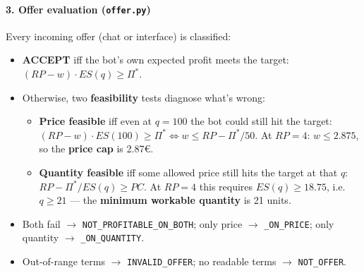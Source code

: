 \paragraph*{3. Offer evaluation (\texttt{offer.py})}
Every incoming offer (chat or interface) is classified:
\begin{itemize}
    \item \textbf{ACCEPT} iff the bot's own expected profit meets the
    target: $(RP - w)\cdot ES(q) \ge \Pi^*$.
    \item Otherwise, two \textbf{feasibility} tests diagnose what's wrong:
    \begin{itemize}
        \item \textbf{Price feasible} iff even at $q=100$ the bot could
        still hit the target: $(RP - w)\cdot ES(100) \ge \Pi^* \iff
        w \le RP - \Pi^*/50$. At $RP=4$: $w \le 2.875$, so the
        \textbf{price cap} is 2.87€.
        \item \textbf{Quantity feasible} iff some allowed price still hits
        the target at that $q$: $RP - \Pi^*/ES(q) \ge PC$. At $RP=4$ this
        requires $ES(q) \ge 18.75$, i.e. $q \ge 21$ --- the
        \textbf{minimum workable quantity} is 21 units.
    \end{itemize}
    \item Both fail $\rightarrow$ \texttt{NOT\_PROFITABLE\_ON\_BOTH};
    only price $\rightarrow$ \texttt{\_ON\_PRICE}; only quantity
    $\rightarrow$ \texttt{\_ON\_QUANTITY}.
    \item Out-of-range terms $\rightarrow$ \texttt{INVALID\_OFFER}; no
    readable terms $\rightarrow$ \texttt{NOT\_OFFER}.
\end{itemize}

